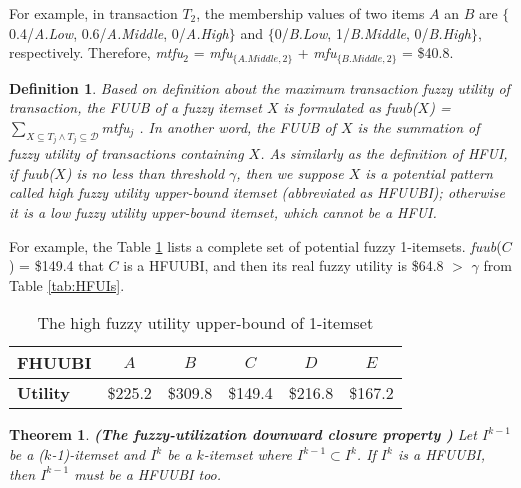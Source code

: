\documentclass[journal]{IEEEtran}
\newtheorem{definition}{Definition}[section]
\newtheorem{theorem}{Theorem}   %
\begin{document}
For example, in transaction $T_2$, the membership values of two items $A$ an $B$ are $\{$0.4/\textit{A.Low}, 0.6/\textit{A.Middle}, 0/\textit{A.High}$\}$ and $\{$0/\textit{B.Low}, 1/\textit{B.Middle}, 0/\textit{B.High}$\}$, respectively. Therefore, \textit{mtfu}$_2$ = \textit{mfu}$_{\{A.Middle, 2\}}$ + \textit{mfu}$_{\{B.Middle, 2\}}$ = \$40.8.

\begin{definition}
	\rm  Based on definition about the maximum transaction fuzzy utility of transaction, the FUUB of a fuzzy itemset $X$ is formulated as \textit{fuub}($X$) = $\sum_{X \subseteq T_j \land T_j \subseteq \mathcal{D}}$\textit{mtfu}$_j$ \cite{lan2015fuzzy}. In another word, the FUUB of $X$ is the summation of fuzzy utility of transactions containing $X$. As similarly as the definition of HFUI, if \textit{fuub}($X$) is no less than threshold $\gamma$, then we suppose $X$ is a potential pattern called high fuzzy utility upper-bound itemset (abbreviated as HFUUBI); otherwise it is a low fuzzy utility upper-bound itemset, which cannot be a HFUI.
\end{definition}

For example, the Table \ref{tab:hfuubi} lists a complete set of potential fuzzy 1-itemsets. \textit{fuub}($C$) = \$149.4 that $C$ is a HFUUBI, and then its real fuzzy utility is \$64.8 $>$ $\gamma$ from Table \ref{tab:HFUIs}.

\begin{table}[!h]
	\begin{center}
		\caption{The high fuzzy utility upper-bound of 1-itemset}
		\label{tab:hfuubi}
		\begin{tabular}{lccccc}
			\hline
			\textbf{FHUUBI} & $A$ & $B$ & $C$ & $D$ & $E$ \\ \hline
			\textbf{Utility} & \$225.2 & \$309.8 & \$149.4 & \$216.8 & \$167.2 \\ \hline
		\end{tabular}
	\end{center}
\end{table}

\begin{theorem}
	\textbf{(The fuzzy-utilization downward closure property \cite{lan2015fuzzy})}
	\label{theo:fuzzyDC}
	\rm Let $I^{k-1}$ be a ($k$-1)-itemset and $I^k$ be a $k$-itemset where $I^{k-1} \subset I^k$. If $I^k$ is a HFUUBI, then $I^{k-1}$ must be a HFUUBI too.
\end{theorem}
\end{document}
